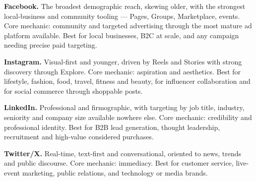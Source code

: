 \begin{qlist}
\begin{apts}
\item \textbf{Facebook.} The broadest demographic reach, skewing older, with
      the strongest local-business and community tooling --- Pages, Groups,
      Marketplace, events. Core mechanic: community and targeted advertising
      through the most mature ad platform available. Best for local businesses,
      B2C at scale, and any campaign needing precise paid targeting.
\item \textbf{Instagram.} Visual-first and younger, driven by Reels and Stories
      with strong discovery through Explore. Core mechanic: aspiration and
      aesthetics. Best for lifestyle, fashion, food, travel, fitness and beauty,
      for influencer collaboration and for social commerce through shoppable
      posts.
\item \textbf{LinkedIn.} Professional and firmographic, with targeting by job
      title, industry, seniority and company size available nowhere else. Core
      mechanic: credibility and professional identity. Best for B2B lead
      generation, thought leadership, recruitment and high-value considered
      purchases.
\item \textbf{Twitter/X.} Real-time, text-first and conversational, oriented to
      news, trends and public discourse. Core mechanic: immediacy. Best for
      customer service, live-event marketing, public relations, and technology
      or media brands.
\end{apts}


\end{qlist}
